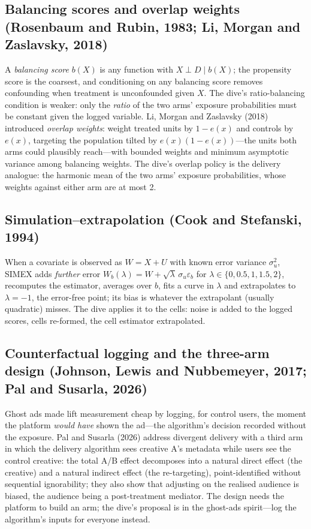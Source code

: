 \subsection{Balancing scores and overlap weights (Rosenbaum and Rubin, 1983; Li, Morgan and Zaslavsky, 2018)}

A \emph{balancing score} $b(X)$ is any function with $X \perp D \mid b(X)$; the propensity score is the coarsest, and conditioning on any balancing score removes confounding when treatment is unconfounded given $X$. The dive's ratio-balancing condition is weaker: only the \emph{ratio} of the two arms' exposure probabilities must be constant given the logged variable. Li, Morgan and Zaslavsky (2018) introduced \emph{overlap weights}: weight treated units by $1 - e(x)$ and controls by $e(x)$, targeting the population tilted by $e(x)(1-e(x))$---the units both arms could plausibly reach---with bounded weights and minimum asymptotic variance among balancing weights. The dive's overlap policy is the delivery analogue: the harmonic mean of the two arms' exposure probabilities, whose weights against either arm are at most 2.

\subsection{Simulation--extrapolation (Cook and Stefanski, 1994)}

When a covariate is observed as $W = X + U$ with known error variance $\sigma_u^2$, SIMEX adds \emph{further} error $W_b(\lambda) = W + \sqrt{\lambda}\,\sigma_u\varepsilon_b$ for $\lambda \in \{0, 0.5, 1, 1.5, 2\}$, recomputes the estimator, averages over $b$, fits a curve in $\lambda$ and extrapolates to $\lambda = -1$, the error-free point; its bias is whatever the extrapolant (usually quadratic) misses. The dive applies it to the cells: noise is added to the logged scores, cells re-formed, the cell estimator extrapolated.

\subsection{Counterfactual logging and the three-arm design (Johnson, Lewis and Nubbemeyer, 2017; Pal and Susarla, 2026)}

Ghost ads made lift measurement cheap by logging, for control users, the moment the platform \emph{would have} shown the ad---the algorithm's decision recorded without the exposure. Pal and Susarla (2026) address divergent delivery with a third arm in which the delivery algorithm sees creative A's metadata while users see the control creative: the total A/B effect decomposes into a natural direct effect (the creative) and a natural indirect effect (the re-targeting), point-identified without sequential ignorability; they also show that adjusting on the realised audience is biased, the audience being a post-treatment mediator. The design needs the platform to build an arm; the dive's proposal is in the ghost-ads spirit---log the algorithm's inputs for everyone instead.

